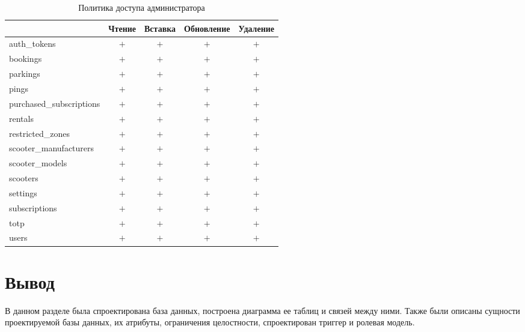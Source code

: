 \begin{table}[H]
	\begin{threeparttable}[b]
		\caption{Политика доступа администратора}
		\label{tbl:admin-policy}
		{\renewcommand{\arraystretch}{1.2}
			\begin{tabularx}{\textwidth}
				{
					| >{\raggedright\arraybackslash}X
					| >{\centering\arraybackslash}c
					| >{\centering\arraybackslash}c
					| >{\centering\arraybackslash}c
					| >{\centering\arraybackslash}c |
				}
				\hline
				                         & \textbf{Чтение} & \textbf{Вставка} & \textbf{Обновление} & \textbf{Удаление} \\
				\hline
				auth\_tokens             & $+$             & $+$              & $+$                 & $+$               \\
				\hline
				bookings                 & $+$             & $+$              & $+$                 & $+$               \\
				\hline
				parkings                 & $+$             & $+$              & $+$                 & $+$               \\
				\hline
				pings                    & $+$             & $+$              & $+$                 & $+$               \\
				\hline
				purchased\_subscriptions & $+$             & $+$              & $+$                 & $+$               \\
				\hline
				rentals                  & $+$             & $+$              & $+$                 & $+$               \\
				\hline
				restricted\_zones        & $+$             & $+$              & $+$                 & $+$               \\
				\hline
				scooter\_manufacturers   & $+$             & $+$              & $+$                 & $+$               \\
				\hline
				scooter\_models          & $+$             & $+$              & $+$                 & $+$               \\
				\hline
				scooters                 & $+$             & $+$              & $+$                 & $+$               \\
				\hline
				settings                 & $+$             & $+$              & $+$                 & $+$               \\
				\hline
				subscriptions            & $+$             & $+$              & $+$                 & $+$               \\
				\hline
				totp                     & $+$             & $+$              & $+$                 & $+$               \\
				\hline
				users                    & $+$             & $+$              & $+$                 & $+$               \\
				\hline
			\end{tabularx}}
	\end{threeparttable}
\end{table}

\section*{Вывод}

В данном разделе была спроектирована база данных, построена диаграмма ее таблиц и связей между ними. Также были описаны сущности проектируемой базы данных, их атрибуты, ограничения целостности, спроектирован триггер и ролевая модель.